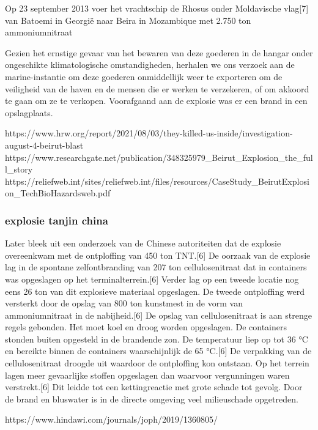 Op 23 september 2013 voer het vrachtschip de Rhosus onder Moldavische vlag[7] van Batoemi in Georgië naar Beira in Mozambique met 2.750 ton ammoniumnitraat

Gezien het ernstige gevaar van het bewaren van deze goederen in de hangar onder ongeschikte klimatologische omstandigheden, herhalen we ons verzoek aan de marine-instantie om deze goederen onmiddellijk weer te exporteren om de veiligheid van de haven en de mensen die er werken te verzekeren, of om akkoord te gaan om ze te verkopen.
Voorafgaand aan de explosie was er een brand in een opslagplaats. 

https://www.hrw.org/report/2021/08/03/they-killed-us-inside/investigation-august-4-beirut-blast 
https://www.researchgate.net/publication/348325979_Beirut_Explosion_the_full_story 
https://reliefweb.int/sites/reliefweb.int/files/resources/CaseStudy_BeirutExplosion_TechBioHazardsweb.pdf 
\subsubsection{explosie tanjin china 
}

Later bleek uit een onderzoek van de Chinese autoriteiten dat de explosie overeenkwam met de ontploffing van 450 ton TNT.[6] 
De oorzaak van de explosie lag in de spontane zelfontbranding van 207 ton cellulosenitraat dat in containers was opgeslagen op het terminalterrein.[6] 
Verder lag op een tweede locatie nog eens 26 ton van dit explosieve materiaal opgeslagen.
De tweede ontploffing werd versterkt door de opslag van 800 ton kunstmest in de vorm van ammoniumnitraat in de nabijheid.[6]
De opslag van cellulosenitraat is aan strenge regels gebonden. Het moet koel en droog worden opgeslagen. De containers stonden buiten opgesteld in de brandende zon. De temperatuur liep op tot 36 °C en bereikte binnen de containers waarschijnlijk de 65 °C.[6] De verpakking van de cellulosenitraat droogde uit waardoor de ontploffing kon ontstaan. Op het terrein lagen meer gevaarlijke stoffen opgeslagen dan waarvoor vergunningen waren verstrekt.[6] Dit leidde tot een kettingreactie met grote schade tot gevolg. Door de brand en bluswater is in de directe omgeving veel milieuschade opgetreden.


https://www.hindawi.com/journals/joph/2019/1360805/ 

